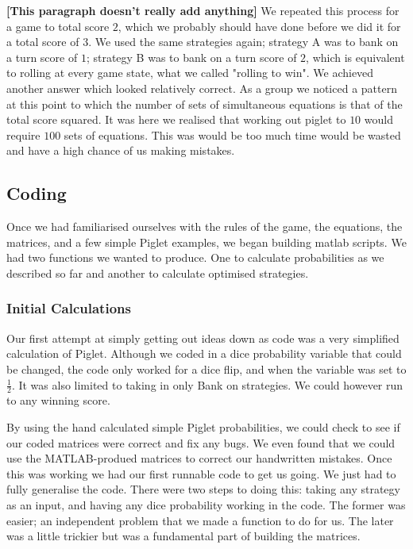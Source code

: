 \documentclass[a4paper,titlepage]{article}
\begin{document}
\textbf{[This paragraph doesn't really add anything]} We repeated this process for a game to total score $2$, which we probably should have done before we did it for a total score of $3$. We used the same strategies again; strategy A was to bank on a turn score of $1$; strategy B was to bank on a turn score of $2$, which is equivalent to rolling at every game state, what we called "rolling to win". We achieved another answer which looked relatively correct. As a group we noticed a pattern at this point to which the number of sets of simultaneous equations is that of the total score squared. It was here we realised that working out piglet to $10$ would require $100$ sets of equations. This was would be too much time would be wasted and have a high chance of us making mistakes.

\subsection{Coding}
Once we had familiarised ourselves with the rules of the game, the equations, the matrices, and a few simple Piglet examples, we began building matlab scripts. We had two functions we wanted to produce. One to calculate probabilities as we described so far and another to calculate optimised strategies.

\subsubsection{Initial Calculations}
Our first attempt at simply getting out ideas down as code was a very simplified calculation of Piglet. Although we coded in a dice probability variable that could be changed, the code only worked for a dice flip, and when the variable was set to $\frac{1}{2}$. It was also limited to taking in only Bank on strategies. We could however run to any winning score.

By using the hand calculated simple Piglet probabilities, we could check to see if our coded matrices were correct and fix any bugs. We even found that we could use the MATLAB-produed matrices to correct our handwritten mistakes. Once this was working we had our first runnable code to get us going. We just had to fully generalise the code. There were two steps to doing this: taking any strategy as an input, and having any dice probability working in the code. The former was easier; an independent problem that we made a function to do for us. The later was a little trickier but was a fundamental part of building the matrices.
\end{document}
